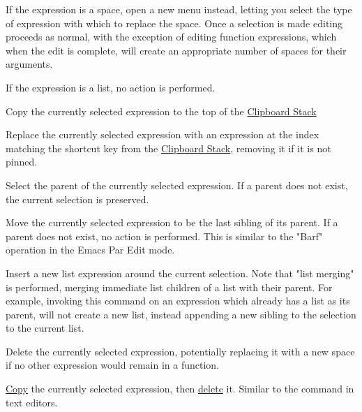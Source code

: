If the expression is a space, open a new menu instead,
letting you select the type of expression with which to replace the space. 
Once a selection is made editing proceeds as normal, with the exception of
editing function expressions, which when the edit is complete, will create
an appropriate number of spaces for their arguments.

If the expression is a list, no action is performed.


Copy the currently selected expression to the top of the
\hyperref[soln:clipboard_list]{Clipboard Stack}

Replace the currently selected expression with an expression at the index
matching the shortcut key from the
\hyperref[soln:clipboard_list]{Clipboard Stack}, removing it if it is not
pinned.

Select the parent of the currently selected expression. If a parent does not
exist, the current selection is preserved.

Move the currently selected expression to be the last sibling of its parent.
If a parent does not exist, no action is performed.
This is similar to the "Barf" operation in the Emacs Par Edit mode.


Insert a new list expression around the current selection. Note that "list
merging" is performed, merging immediate list children of a list with their
parent. For example, invoking this command on an expression
which already has a list as its parent, will not create a new list, instead
appending a new sibling to the selection to the current list.

Delete the currently selected expression, potentially replacing it with a new
space if no other expression would remain in a function.


\hyperref[cmd:copy]{Copy} the currently selected expression, then
\hyperref[cmd:delete]{delete} it. Similar to the  command in
text editors.


